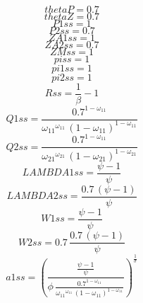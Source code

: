 \begin{dmath*}
thetaP = 0.7
\end{dmath*}
\begin{dmath*}
thetaZ = 0.7
\end{dmath*}
\begin{dmath*}
P1ss = 1
\end{dmath*}
\begin{dmath*}
P2ss = 0.7
\end{dmath*}
\begin{dmath*}
ZA1ss = 1
\end{dmath*}
\begin{dmath*}
ZA2ss = 0.7
\end{dmath*}
\begin{dmath*}
ZMss = 1
\end{dmath*}
\begin{dmath*}
piss = 1
\end{dmath*}
\begin{dmath*}
pi1ss = 1
\end{dmath*}
\begin{dmath*}
pi2ss = 1
\end{dmath*}
\begin{dmath*}
Rss = \frac{1}{{{\beta}}}-1
\end{dmath*}
\begin{dmath*}
Q1ss = \frac{0.7^{1-{{\omega_{11}}}}}{{{\omega_{11}}}^{{{\omega_{11}}}}\, \left(1-{{\omega_{11}}}\right)^{1-{{\omega_{11}}}}}
\end{dmath*}
\begin{dmath*}
Q2ss = \frac{0.7^{1-{{\omega_{11}}}}}{{{\omega_{21}}}^{{{\omega_{21}}}}\, \left(1-{{\omega_{21}}}\right)^{1-{{\omega_{21}}}}}
\end{dmath*}
\begin{dmath*}
LAMBDA1ss = \frac{{{\psi}}-1}{{{\psi}}}
\end{dmath*}
\begin{dmath*}
LAMBDA2ss = \frac{0.7\, \left({{\psi}}-1\right)}{{{\psi}}}
\end{dmath*}
\begin{dmath*}
W1ss = \frac{{{\psi}}-1}{{{\psi}}}
\end{dmath*}
\begin{dmath*}
W2ss = 0.7\, \frac{0.7\, \left({{\psi}}-1\right)}{{{\psi}}}
\end{dmath*}
\begin{dmath*}
a1ss = \left(\frac{\frac{{{\psi}}-1}{{{\psi}}}}{{{\phi}}\, \frac{0.7^{1-{{\omega_{11}}}}}{{{\omega_{11}}}^{{{\omega_{11}}}}\, \left(1-{{\omega_{11}}}\right)^{1-{{\omega_{11}}}}}}\right)^{\frac{1}{{{\sigma}}}}
\end{dmath*}
